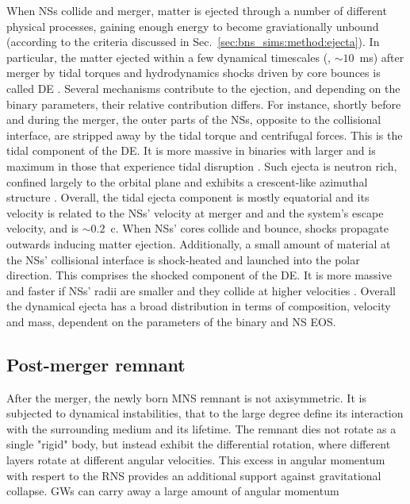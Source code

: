 When \acp{NS} collide and merger, matter is ejected through a number of 
different physical processes, gaining enough energy to become graviationally 
unbound (according to the criteria discussed in Sec.~\ref{sec:bns_sims:method:ejecta}). 
In particular, the matter ejected within a few dynamical timescales (\ie, ${\sim}10$~ms) 
after merger by tidal torques and hydrodynamics shocks driven by core bounces 
is called \ac{DE} \citep[\eg][]{Hotokezaka:2013b,Bauswein:2013yna,Radice:2016dwd,Radice:2018pdn}. 
%
%
Several mechanisms contribute to the ejection, and depending on the 
binary parameters, their relative contribution differs.
%
For instance, shortly before and during the merger, the outer parts 
of the \acp{NS}, opposite to the collisional interface, are stripped 
away by the tidal torque and centrifugal forces. This is the tidal 
component of the \ac{DE}. It is more massive in binaries with 
larger \mr{} and is maximum in those that experience tidal disruption 
\citep[\eg][]{Radice:2018pdn,Bernuzzi:2020txg}.
%
Such ejecta is neutron rich, confined largely to the orbital plane and exhibits 
a crescent-like azimuthal structure \citep{Bernuzzi:2020txg}.
%
Overall, the tidal ejecta component is mostly equatorial and its 
velocity is related to the \acp{NS}' velocity at merger and 
and the system's escape velocity, and is $\sim0.2$~c.
%
When \acp{NS}' cores collide and bounce, shocks propagate outwards inducing 
matter ejection. Additionally, a small amount of material at the 
\acp{NS}' collisional interface is shock-heated and launched into the polar 
direction. This comprises the shocked component of the \ac{DE}.
%
It is more massive and faster if \acp{NS}' radii are smaller and they collide 
at higher velocities \citep[\eg][]{Radice:2018pdn}. 
%
Overall the dynamical ejecta has a broad distribution in terms of composition, 
velocity and mass, dependent on the parameters of the binary and \ac{NS} \ac{EOS}.


\subsection{Post-merger remnant}

After the merger, the newly born \ac{MNS} remnant is not axisymmetric. It is 
subjected to dynamical instabilities, that to the large degree define its interaction 
with the surrounding medium and its lifetime. The remnant dies not rotate as a 
single "rigid" body, but instead exhibit the differential rotation, where 
different layers rotate at different angular velocities. This excess in 
angular momentum with respert to the \ac{RNS} provides an additional support 
against gravitational collapse. \acp{GW} can carry away a large amount 
of angular momentum 


